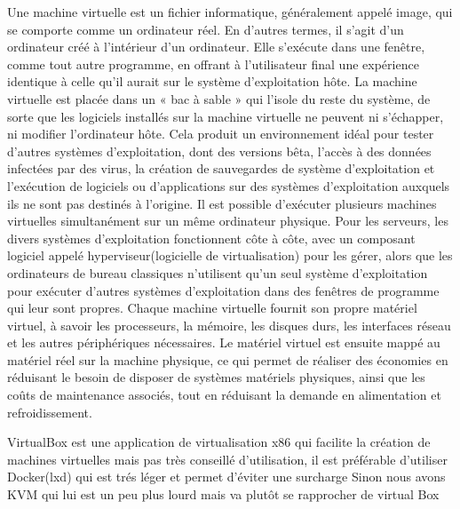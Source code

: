 Une machine virtuelle est un fichier informatique, généralement appelé image, qui se comporte comme un ordinateur réel. En d’autres termes, il s’agit d’un ordinateur créé à l’intérieur d’un ordinateur. Elle s’exécute dans une fenêtre, comme tout autre programme, en offrant à l’utilisateur final une expérience identique à celle qu’il aurait sur le système d’exploitation hôte. La machine virtuelle est placée dans un « bac à sable » qui l’isole du reste du système, de sorte que les logiciels installés sur la machine virtuelle ne peuvent ni s’échapper, ni modifier l’ordinateur hôte. Cela produit un environnement idéal pour tester d’autres systèmes d’exploitation, dont des versions bêta, l’accès à des données infectées par des virus, la création de sauvegardes de système d’exploitation et l’exécution de logiciels ou d’applications sur des systèmes d’exploitation auxquels ils ne sont pas destinés à l’origine.
Il est possible d’exécuter plusieurs machines virtuelles simultanément sur un même ordinateur physique. Pour les serveurs, les divers systèmes d’exploitation fonctionnent côte à côte, avec un composant logiciel appelé hyperviseur(logicielle de virtualisation) pour les gérer, alors que les ordinateurs de bureau classiques n’utilisent qu’un seul système d’exploitation pour exécuter d’autres systèmes d’exploitation dans des fenêtres de programme qui leur sont propres. Chaque machine virtuelle fournit son propre matériel virtuel, à savoir les processeurs, la mémoire, les disques durs, les interfaces réseau et les autres périphériques nécessaires. Le matériel virtuel est ensuite mappé au matériel réel sur la machine physique, ce qui permet de réaliser des économies en réduisant le besoin de disposer de systèmes matériels physiques, ainsi que les coûts de maintenance associés, tout en réduisant la demande en alimentation et refroidissement.


VirtualBox est une application de virtualisation x86 qui facilite la création de machines virtuelles mais pas très conseillé d’utilisation,  il est préférable d'utiliser Docker(lxd) qui est trés léger et permet d'éviter une surcharge 
Sinon nous avons KVM qui lui est un peu plus lourd mais va plutôt se rapprocher de virtual Box


